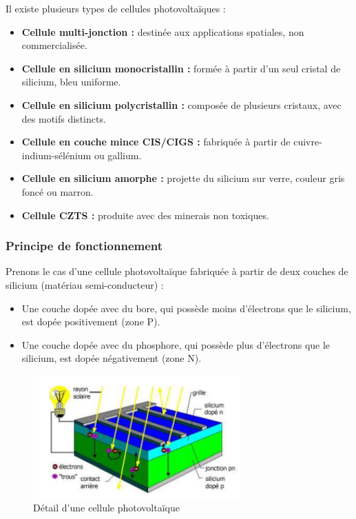 Il existe plusieurs types de cellules photovoltaïques :
\begin{itemize}
	\item \textbf{Cellule multi-jonction :} destinée aux applications spatiales, non commercialisée.
	\item \textbf{Cellule en silicium monocristallin :} formée à partir d’un seul cristal de silicium, bleu uniforme.
	\item \textbf{Cellule en silicium polycristallin :} composée de plusieurs cristaux, avec des motifs distincts.
	\item \textbf{Cellule en couche mince CIS/CIGS :} fabriquée à partir de cuivre-indium-sélénium ou gallium.
	\item \textbf{Cellule en silicium amorphe :} projette du silicium sur verre, couleur gris foncé ou marron.
	\item \textbf{Cellule CZTS :} produite avec des minerais non toxiques.
\end{itemize}

\subsubsection{Principe de fonctionnement}
Prenons le cas d'une cellule photovoltaïque fabriquée à partir de deux couches de silicium (matériau semi-conducteur) :
\begin{itemize}
	\item Une couche dopée avec du bore, qui possède moins d'électrons que le silicium, est dopée positivement (zone P).
	\item Une couche dopée avec du phosphore, qui possède plus d'électrons que le silicium, est dopée négativement (zone N).
\end{itemize}

\begin{figure}[H]
	\centering
	\includegraphics[width=8cm]{./img/cellulePrincipe.png}
	\caption{Détail d'une cellule photovoltaïque}
	\label{i1}
\end{figure}

